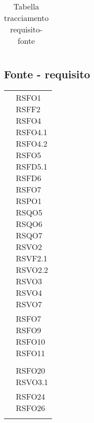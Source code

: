 {{{{{\begin{center}
\begin{longtable}{|p{7.5cm}|p{7.5cm}|}
		\caption[Tabella tracciamento requisito-fonte]{Tabella tracciamento requisito-fonte}\label{4.5}\\
	\end{longtable}
\end{center}
\clearpage
\subsection{Fonte - requisito}\label{RequisitiTracciamentoDeiRequisitiFonteRequisito}
\def\tabularxcolumn#1{m{#1}}
{
	\begin{center}
		\renewcommand{\arraystretch}{1.4}
		\begin{longtable}{|p{7.5cm}|p{7.5cm}|}
		\hline
		\rowcolor{airforceblue}
		\makecell[c]{\textbf{Fonte}} & \makecell[c]{\textbf{Codice RS}}  \\
		\hline
		\makecell[c]{Capitolato$_{\scaleto{G}{3pt}}$} & \makecell[c]{RSFO1\\RSFF2\\RSFO4\\RSFO4.1\\RSFO4.2\\RSFO5\\RSFD5.1\\RSFD6\\RSFO7\\RSPO1\\RSQO5\\RSQO6\\RSQO7\\RSVO2\\RSVF2.1\\RSVO2.2\\RSVO3\\RSVO4\\RSVO7} \\
		\hline
		\makecell[c]{UC1} & \makecell[c]{RSFO7 \\ RSFO9 \\ RSFO10 \\ RSFO11} \\
		\hline
		\makecell[c]{UC2} & \makecell[c]{RSFO3} \\
		\hline
		\makecell[c]{UC3} & \makecell[c]{RSFO20 \\ RSVO3.1 } \\ %
		\hline
		\makecell[c]{UC4.1} & \makecell[c]{RSFO24 \\ RSFO26} \\
		\hline
		\makecell[c]{UC4.2} & \makecell[c]{RSFO27} \\

\end{longtable}
\end{center}}}}}}}
